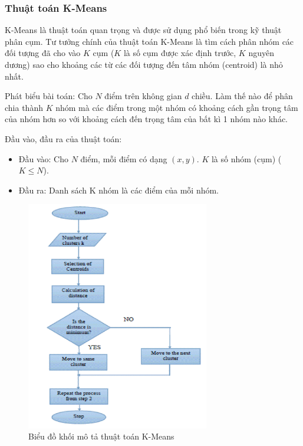 \subsubsection{Thuật toán K-Means}
K-Means là thuật toán quan trọng và được sử dụng phổ biến
trong kỹ thuật phân cụm. Tư tưởng chính của thuật toán K-Means
là tìm cách phân nhóm các đối tượng đã cho vào $K$ cụm ($K$ là
số cụm được xác định trước, $K$ nguyên dương) sao cho khoảng các từ
các đối tượng đến tâm nhóm (centroid) là nhỏ nhất.

Phát biểu bài toán: Cho $N$ điểm trên không gian $d$ chiều.
Làm thế nào để phân chia thành $K$ nhóm mà các điểm trong
một nhóm có khoảng cách gần trọng tâm của nhóm hơn so với
khoảng cách đến trọng tâm của bất kì 1 nhóm nào khác.

Đầu vào, đầu ra của thuật toán:
\begin{itemize}[topsep=0ex]
\item Đầu vào: Cho $N$ điểm, mỗi điểm có 
    dạng $(x, y)$. $K$ là số nhóm (cụm) ($K \le N$).
\item Đầu ra: Danh sách K nhóm là các điểm của mỗi nhóm.
\end{itemize}
\begin{figure}[H]
    \centering
    \includegraphics[width=8cm]{images/k-means-flow.png}
    \caption{Biểu đồ khối mô tả thuật toán K-Means}
\end{figure}

